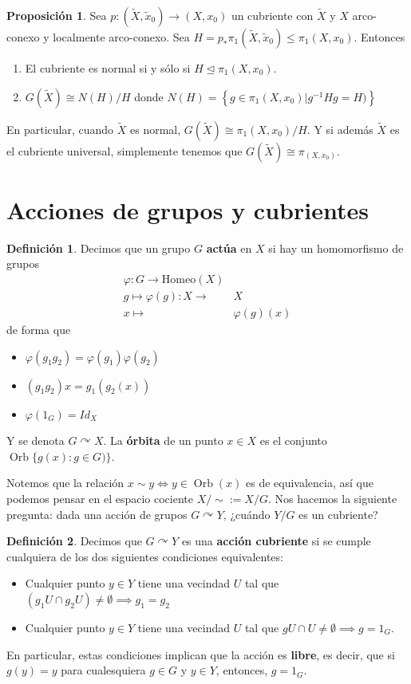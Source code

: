 \documentclass[spanish]{book}
\theoremstyle{definition}
\newtheorem*{defn}{Definición}
\newtheorem*{prop}{Proposición}
\DeclareMathOperator{\Orb}{Orb}
\begin{document}
	\begin{prop}
		Sea $p:(\tilde{X},\tilde{x}_0)\to (X,x_0)$ un cubriente con $\tilde{X}$ y $X$ arco-conexo y localmente arco-conexo. Sea $H=p_*\pi_1(\tilde{X},\tilde{x}_0)\leq\pi_1(X,x_0)$. Entonces
		\begin{enumerate}[label=\alph*)]
			\item El cubriente es normal si y sólo si $H\trianglelefteq\pi_1(X,x_0)$.
			\item $G(\tilde{X})\cong N(H)/H$
			donde $N(H)=\left\{g\in\pi_1(X,x_0)|g^{-1}Hg=H)\right\}$
		\end{enumerate}
		En particular, cuando $\tilde{X}$ es normal, $G(\tilde{X})\cong\pi_1(X,x_0)/H$. Y si además $\tilde{X}$ es el cubriente universal, simplemente tenemos que $G(\tilde{X})\cong\pi_(X,x_0)$.
	\end{prop}
\section{Acciones de grupos y cubrientes}\label{sec:acciones}
\begin{defn}
	Decimos que un grupo $G$ \textbf{actúa} en $X$ si hay un homomorfismo de grupos
	\begin{align*}
		\varphi:G\to\text{Homeo}(X)\\
		g\mapsto\varphi(g):X\to &X\\
		x\mapsto&\varphi(g)(x)
	\end{align*}
	de forma que
	\begin{itemize}
		\item  $\varphi(g_1g_2)=\varphi(g_1)\varphi(g_2)$
		\item $(g_1g_2)x=g_1(g_2(x))$
		\item $\varphi(1_G)=Id_X$
	\end{itemize}
	Y se denota $G\curvearrowright X$.
	La \textbf{órbita} de un punto $x\in X$ es el conjunto $\Orb\{g(x):g\in G)\}$.
\end{defn}
Notemos que la relación $x\sim{}y\iff y\in\Orb(x)$ es de equivalencia, así que podemos pensar en el espacio cociente $X/\sim{}:=X/G$. Nos hacemos la siguiente pregunta: dada una acción de grupos $G\curvearrowright Y$, ¿cuándo $Y/G$ es un cubriente?
\begin{defn}
	Decimos que $G\curvearrowright Y$ es una \textbf{acción cubriente} si se cumple cualquiera de los dos siguientes condiciones equivalentes:
	\begin{itemize}
		\item Cualquier punto $y\in Y$ tiene una vecindad $U$ tal que $(g_1U\cap g_2U)\neq\emptyset\implies g_1=g_2$
		\item Cualquier punto $y\in Y$ tiene una vecindad $U$ tal que $gU\cap U\neq\emptyset\implies g=1_G$.
	\end{itemize}
	En particular, estas condiciones implican que la acción es \textbf{libre}, es decir, que si $g(y)=y$ para cualesquiera $g\in G$ y $y\in Y$, entonces, $g=1_G$.
\end{defn}
\end{document}
